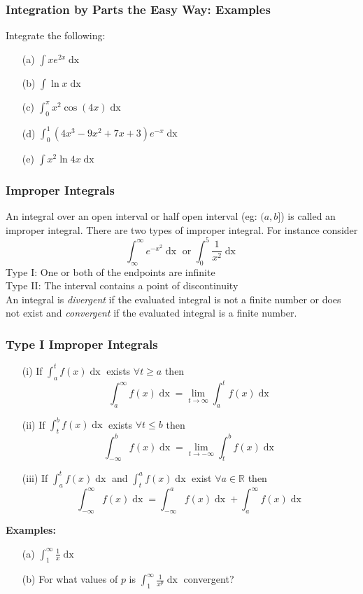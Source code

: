 \documentclass{beamer}
\begin{document}
\begin{frame}
\frametitle{Integration by Parts the Easy Way: Examples}
Integrate the following:
\begin{itemize}
	\item[(a)] $\int xe^{2x} \mathop{dx}$
	\item[(b)] $\int \ln x \mathop{dx}$
	\item[(c)] $\int_0^\pi x^2 \cos(4x) \mathop{dx}$
	\item[(d)] $\int_0^1 (4x^3 -9x^2+7x+3)e^{-x} \mathop{dx}$
	\item[(e)] $\int x^2 \ln 4x \mathop{dx} $
\end{itemize}
\end{frame}

\begin{frame}
\frametitle{Improper Integrals}
An integral over an open interval or half open interval (eg: $(a,b]$) is called an improper integral. There are two types of improper integral. For instance consider
$$\int_{\infty}^{\infty} e^{-x^2} \mathop{dx} \mbox{ or } \int_0^5 \frac{1}{x^2} \mathop{dx}$$
Type I: One or both of the endpoints are infinite\\
Type II: The interval contains a point of discontinuity\\

\vspace{6pt}
An integral is \textit{divergent} if the evaluated integral is not a finite number or does not exist and \textit{convergent} if the evaluated integral is a finite number.
\end{frame}

\begin{frame}
\frametitle{Type I Improper Integrals}
\begin{itemize}
	\item[(i)] If $\int_{a}^{t} f(x) \mathop{dx}$ exists $\forall t \geq a$ then
	$$\int_{a}^{\infty}f(x) \mathop{dx} = \lim\limits_{t \to \infty} \int_a^tf(x) \mathop{dx}$$
	\item[(ii)] If $\int_{t}^{b} f(x) \mathop{dx}$ exists $\forall t \leq b$ then
	$$\int_{-\infty}^{b}f(x) \mathop{dx} = \lim\limits_{t \to -\infty} \int_t^bf(x) \mathop{dx}$$
	\item[(iii)] If  $\int_{a}^{t} f(x) \mathop{dx}$ and $\int_{t}^{a} f(x) \mathop{dx}$ exist $\forall a \in \mathbb{R}$ then
	$$\int_{-\infty}^\infty f(x) \mathop{dx} = \int_{-\infty}^a f(x) \mathop{dx} + \int_{a}^\infty f(x) \mathop{dx}$$
\end{itemize}

\vspace{6pt}
\textbf{Examples:}
\begin{itemize}
	\item[(a)] $\int_{1}^{\infty}\frac{1}{x} \mathop{dx}$
	\item[(b)] For what values of $p$ is $\int_{1}^{\infty}\frac{1}{x^p} \mathop{dx}$ convergent?
\end{itemize}
\end{frame}
\end{document}
